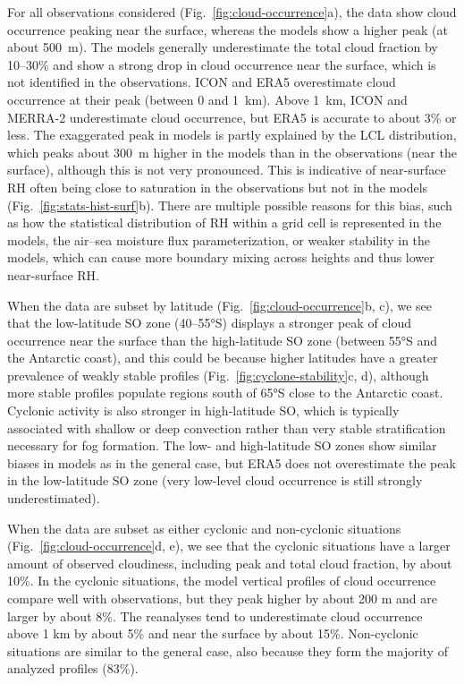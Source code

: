 \documentclass[draft]{agujournal2019}
\begin{document}
For all observations considered (Fig.~\ref{fig:cloud-occurrence}a), the data show cloud occurrence peaking near the surface, whereas the models show a higher peak (at about 500~m). The models generally underestimate the total cloud fraction by 10--30\% and show a strong drop in cloud occurrence near the surface, which is not identified in the observations. ICON and ERA5 overestimate cloud occurrence at their peak (between 0 and 1~km). Above 1~km, ICON and MERRA-2 underestimate cloud occurrence, but ERA5 is accurate to about 3\% or less. The exaggerated peak in models is partly explained by the LCL distribution, which peaks about 300~m higher in the models than in the observations (near the surface), although this is not very pronounced. This is indicative of near-surface RH often being close to saturation in the observations but not in the models (Fig.~\ref{fig:stats-hist-surf}b). There are multiple possible reasons for this bias, such as how the statistical distribution of RH within a grid cell is represented in the models, the air--sea moisture flux parameterization, or weaker stability in the models, which can cause more boundary mixing across heights and thus lower near-surface RH.

When the data are subset by latitude (Fig.~\ref{fig:cloud-occurrence}b, c), we see that the low-latitude SO zone (40--55°S) displays a stronger peak of cloud occurrence near the surface than the high-latitude SO zone (between 55°S and the Antarctic coast), and this could be because higher latitudes have a greater prevalence of weakly stable profiles (Fig.~\ref{fig:cyclone-stability}c, d), although more stable profiles populate regions south of 65°S close to the Antarctic coast. Cyclonic activity is also stronger in high-latitude SO, which is typically associated with shallow or deep convection rather than very stable stratification necessary for fog formation. The low- and high-latitude SO zones show similar biases in models as in the general case, but ERA5 does not overestimate the peak in the low-latitude SO zone (very low-level cloud occurrence is still strongly underestimated).

When the data are subset as either cyclonic and non-cyclonic situations (Fig.~\ref{fig:cloud-occurrence}d, e), we see that the cyclonic situations have a larger amount of observed cloudiness, including peak and total cloud fraction, by about 10\%. In the cyclonic situations, the model vertical profiles of cloud occurrence compare well with observations, but they peak higher by about 200 m and are larger by about 8\%. The reanalyses tend to underestimate cloud occurrence above 1 km by about 5\% and near the surface by about 15\%. Non-cyclonic situations are similar to the general case, also because they form the majority of analyzed profiles (83\%).
\end{document}
